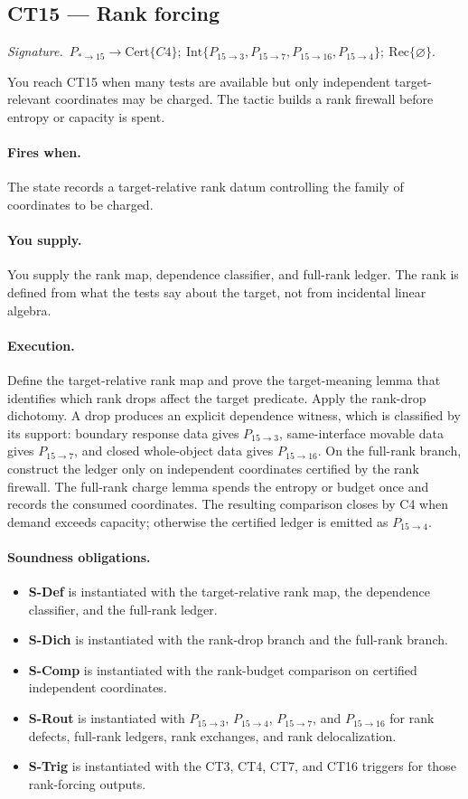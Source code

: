 \documentclass[
  11pt,
]{article}
\providecommand{\tightlist}{%
  \setlength{\itemsep}{0pt}\setlength{\parskip}{0pt}}
\theoremstyle{definition}
\newcommand{\ctsignature}[1]{\par\noindent\emph{Signature.}\ #1\par\medskip}
\newcommand{\ctcert}[1]{\mathrm{Cert}\{#1\}}
\newcommand{\ctint}[1]{\mathrm{Int}\{#1\}}
\newcommand{\ctrec}[1]{\mathrm{Rec}\{#1\}}
\newcommand{\ctnone}{\varnothing}
\newcommand{\ctpar}[1]{\paragraph{#1.}}
\begin{document}
\subsection{CT15 --- Rank forcing}\label{ct:15}\label{rank-forcing-charge-only-independent-coordinates}
\ctsignature{\(P_{\ast\to15}\to \ctcert{C4};\ \ctint{P_{15\to3},P_{15\to7},P_{15\to16},P_{15\to4}};\ \ctrec{\ctnone}\).}

You reach CT15 when many tests are available but only independent
target-relevant coordinates may be charged.  The tactic builds a rank
firewall before entropy or capacity is spent.

\ctpar{Fires when}
The state records a target-relative rank datum controlling the family of
coordinates to be charged.

\ctpar{You supply}
You supply the rank map, dependence classifier, and full-rank ledger.
The rank is defined from what the tests say about the target, not from
incidental linear algebra.

\ctpar{Execution}
Define the target-relative rank map and prove the target-meaning lemma
that identifies which rank drops affect the target predicate.  Apply the
rank-drop dichotomy.  A drop produces an explicit dependence witness,
which is classified by its support: boundary response data gives
\(P_{15\to3}\), same-interface movable data gives \(P_{15\to7}\), and
closed whole-object data gives \(P_{15\to16}\).  On the full-rank
branch, construct the ledger only on independent coordinates certified
by the rank firewall.  The full-rank charge lemma spends the entropy or
budget once and records the consumed coordinates.  The resulting
comparison closes by C4 when demand exceeds capacity; otherwise the
certified ledger is emitted as \(P_{15\to4}\).

\ctpar{Soundness obligations}
\begin{itemize}
\tightlist
\item \textbf{S-Def} is instantiated with the target-relative rank map, the dependence classifier, and the full-rank ledger.
\item \textbf{S-Dich} is instantiated with the rank-drop branch and the full-rank branch.
\item \textbf{S-Comp} is instantiated with the rank-budget comparison on certified independent coordinates.
\item \textbf{S-Rout} is instantiated with \(P_{15\to3}\), \(P_{15\to4}\), \(P_{15\to7}\), and \(P_{15\to16}\) for rank defects, full-rank ledgers, rank exchanges, and rank delocalization.
\item \textbf{S-Trig} is instantiated with the CT3, CT4, CT7, and CT16 triggers for those rank-forcing outputs.
\end{itemize}
\end{document}
